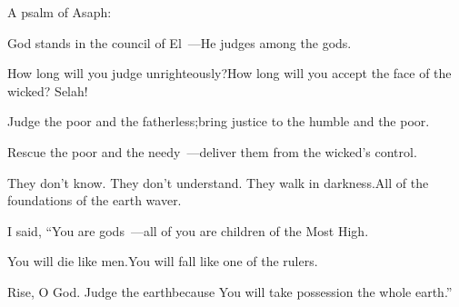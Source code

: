 
\begin{inparaenum}
  \noindent{} A psalm of Asaph:\smallskip%
  
  \pb God stands in the council of El~---\pa He judges among the gods.%
  
  \pb {} How long will you judge unrighteously?\pa How long will you accept the face of the wicked? Selah!%
  
  \pa {} Judge the%
  poor and the fatherless;\pa bring justice to the humble%
  and the poor.%
  
  \pa {} Rescue the poor and the needy~---\pa deliver them from the wicked's control.%
  
  \pb {} They don't know. They don't understand.%
  \pa They walk in darkness.\pa All of the foundations of the earth waver.%
  
  \pa {} I said, ``You are gods~---\pa all of you are children of the Most High.%
  
  \pa {} You will die like men.\pa You will fall like one of the rulers.%
  
  \pb {} Rise, O God. Judge the earth\pa because You will take possession the whole earth.''%
\end{inparaenum}
